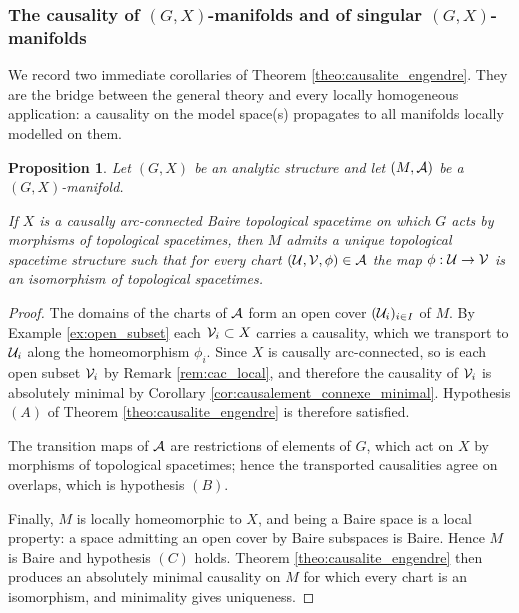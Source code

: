 \documentclass[a4paper,twoside]{article}
\newtheorem{prop}[lem]{Proposition}
\begin{document}
\subsubsection{The causality of $(G,X)$-manifolds and of singular $(G,X)$-manifolds}\label{subsubsec:GX_causality}
We record two immediate corollaries of Theorem \ref{theo:causalite_engendre}. They are the bridge
between the general theory and every locally homogeneous application: a causality on the model
space(s) propagates to all manifolds locally modelled on them.
\begin{prop}\label{prop:GX_espace_temps_topo} Let $(G,X)$ be an analytic structure and let
$(M,\mathcal A)$ be a $(G,X)$-manifold.

If $X$ is a causally arc-connected Baire topological spacetime on which $G$ acts by morphisms of topological spacetimes,
then $M$ admits a unique topological spacetime structure such that for every chart $(\mathcal{U},\mathcal V,\phi)\in\mathcal A$
the map $\phi:\mathcal{U}\rightarrow \mathcal V$ is an isomorphism of topological spacetimes.
\end{prop}
\begin{proof}
The domains of the charts of $\mathcal A$ form an open cover $(\mathcal{U}_i)_{i\in I}$ of $M$. By
Example \ref{ex:open_subset} each $\mathcal V_i\subset X$ carries a causality, which we transport
to $\mathcal{U}_i$ along the homeomorphism $\phi_i$. Since $X$ is causally arc-connected, so is each open
subset $\mathcal V_i$ by Remark \ref{rem:cac_local}, and therefore the causality of $\mathcal V_i$ is absolutely
minimal by Corollary \ref{cor:causalement_connexe_minimal}. Hypothesis $(A)$ of Theorem
\ref{theo:causalite_engendre} is therefore satisfied.

The transition maps of $\mathcal A$ are restrictions of elements of $G$, which act on $X$ by
morphisms of topological spacetimes; hence the transported causalities agree on overlaps,
which is hypothesis $(B)$.

Finally, $M$ is locally homeomorphic to $X$, and being a Baire space is a local property:
a space admitting an open cover by Baire subspaces is Baire. Hence $M$ is Baire and
hypothesis $(C)$ holds. Theorem \ref{theo:causalite_engendre} then produces an absolutely
minimal causality on $M$ for which every chart is an isomorphism, and minimality gives
uniqueness.
\end{proof}
\end{document}
